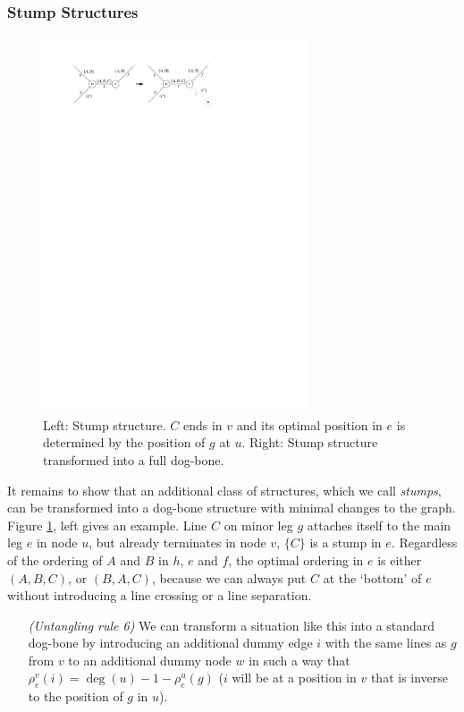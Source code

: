 \documentclass[format=acmsmall, review=false, screen=true]{acmart}
\begin{document}
\subsubsection{Stump Structures}

\begin{figure}
  \includegraphics[width=0.7\textwidth, page=1]{figures/untangling/stump.pdf}
  \caption{Left: Stump structure. $C$ ends in $v$ and its optimal position in $e$ is determined by the position of $g$ at $u$. Right: Stump structure transformed into a full dog-bone.}  
  \label{FIG:untangle_stump}
\end{figure}

It remains to show that an additional class of structures, which we call \emph{stumps}, can be transformed into a dog-bone structure with minimal changes to the graph.
Figure \ref{FIG:untangle_stump}, left gives an example. Line $C$ on minor leg $g$ attaches itself to the main leg $e$ in node $u$, but already terminates in node $v$, $\{C\}$ is a stump in $e$.
Regardless of the ordering of $A$ and $B$ in $h$, $e$ and $f$, the optimal ordering in $e$ is either $(A, B, C)$, or $(B, A, C)$, because we can always put $C$ at the `bottom' of $e$ without introducing a line crossing or a line separation.
\begin{enumerate}[parsep=0.5mm, wide, labelwidth=0mm, itemindent=2.3mm]
  \setlength\itemsep{1pt}
  \item[\emph{(Untangling rule 6)}]We can transform a situation like this into a standard dog-bone by introducing an additional dummy edge $i$ with the same lines as $g$ from $v$ to an additional dummy node $w$ in such a way that $\rho^v_e(i) = \deg(u) - 1 - \rho^u_e(g)$ ($i$ will be at a position in $v$ that is inverse to the position of $g$ in $u$). 
\end{enumerate}
\end{document}
